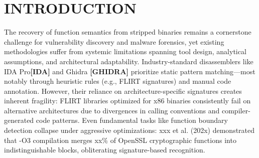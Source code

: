 \documentclass[acmsmall,screen,review,anonymous]{acmart} %
\begin{document}



\maketitle


\section{INTRODUCTION}



The recovery of function semantics from stripped binaries remains a cornerstone challenge for vulnerability discovery and malware forensics, yet existing methodologies suffer from systemic limitations spanning tool design, analytical assumptions, and architectural adaptability. Industry-standard disassemblers like IDA Pro\textbf{[IDA]} and Ghidra \textbf{[GHIDRA]} prioritize static pattern matching—most notably through heuristic rules (e.g., FLIRT signatures) and manual code annotation. However, their reliance on architecture-specific signatures creates inherent fragility: FLIRT libraries optimized for x86 binaries consistently fail on alternative architectures due to divergences in calling conventions and compiler-generated code patterns. Even fundamental tasks like function boundary detection collapse under aggressive optimizations: xxx et al. (202x) demonstrated that -O3 compilation merges xx\% of OpenSSL cryptographic functions into indistinguishable blocks, obliterating signature-based recognition.
\end{document}
